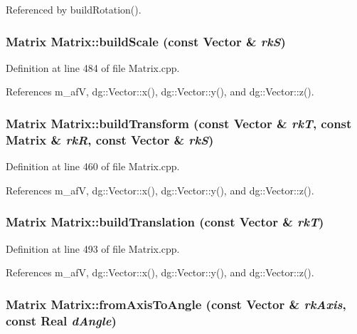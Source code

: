 Referenced by build\-Rotation().
\subsubsection{\setlength{\rightskip}{0pt plus 5cm}Matrix Matrix::build\-Scale (const {\bf Vector} \& {\em rk\-S})\hspace{0.3cm}{\tt  [static]}}\label{classdg_1_1Matrix_d1}




Definition at line 484 of file Matrix.cpp.

References m\_\-af\-V, dg::Vector::x(), dg::Vector::y(), and dg::Vector::z().
\subsubsection{\setlength{\rightskip}{0pt plus 5cm}Matrix Matrix::build\-Transform (const {\bf Vector} \& {\em rk\-T}, const Matrix \& {\em rk\-R}, const {\bf Vector} \& {\em rk\-S})\hspace{0.3cm}{\tt  [static]}}\label{classdg_1_1Matrix_d8}




Definition at line 460 of file Matrix.cpp.

References m\_\-af\-V, dg::Vector::x(), dg::Vector::y(), and dg::Vector::z().
\subsubsection{\setlength{\rightskip}{0pt plus 5cm}Matrix Matrix::build\-Translation (const {\bf Vector} \& {\em rk\-T})\hspace{0.3cm}{\tt  [static]}}\label{classdg_1_1Matrix_d7}




Definition at line 493 of file Matrix.cpp.

References m\_\-af\-V, dg::Vector::x(), dg::Vector::y(), and dg::Vector::z().
\subsubsection{\setlength{\rightskip}{0pt plus 5cm}Matrix Matrix::from\-Axis\-To\-Angle (const {\bf Vector} \& {\em rk\-Axis}, const {\bf Real} {\em d\-Angle})\hspace{0.3cm}{\tt  [static]}}\label{classdg_1_1Matrix_d9}




